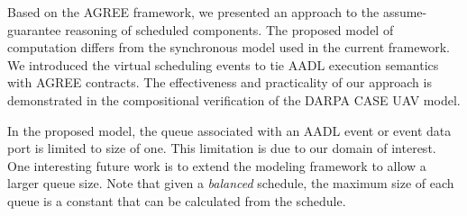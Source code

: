 Based on the AGREE framework, we presented an approach to the assume-guarantee reasoning of scheduled components. The proposed model of computation differs from the synchronous model used in the current framework. We introduced the virtual scheduling events to tie AADL execution semantics with AGREE contracts. The effectiveness and practicality of our approach is demonstrated in the compositional verification of the DARPA CASE UAV model.

In the proposed model, the queue associated with an AADL event or event data port is limited to size of one. This limitation is due to our domain of interest. One interesting future work is to extend the modeling framework to allow a larger queue size. Note that given a \emph{balanced} schedule, the maximum size of each queue is a constant that can be calculated from the schedule.
